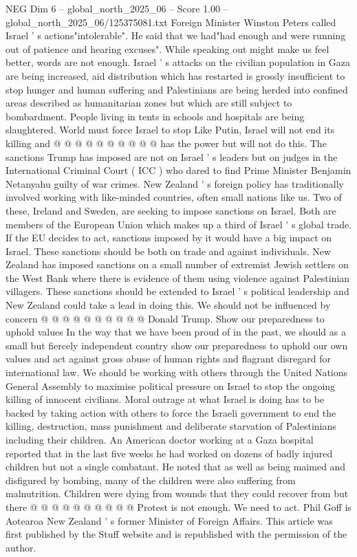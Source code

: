 \begin{textsample}{NEG Dim 6 – global\_north\_2025\_06 – Score 1.00 – global\_north\_2025\_06/125375081.txt}
Foreign Minister Winston Peters called Israel ' s actions"intolerable".
He said that we had"had enough and were running out of patience and hearing excuses".
While speaking out might make us feel better, words are not enough.
Israel ' s attacks on the civilian population in Gaza are being increased, aid distribution which has restarted is grossly insufficient to stop hunger and human suffering and Palestinians are being herded into confined areas described as humanitarian zones but which are still subject to bombardment.
People living in tents in schools and hospitals are being slaughtered.
World must force Israel to stop Like Putin, Israel will not end its killing and @ @ @ @ @ @ @ @ @ @ has the power but will not do this.
The sanctions Trump has imposed are not on Israel ' s leaders but on judges in the International Criminal Court ( ICC ) who dared to find Prime Minister Benjamin Netanyahu guilty of war crimes.
New Zealand ' s foreign policy has traditionally involved working with like-minded countries, often small nations like us.
Two of these, Ireland and Sweden, are seeking to impose sanctions on Israel.
Both are members of the European Union which makes up a third of Israel ' s global trade.
If the EU decides to act, sanctions imposed by it would have a big impact on Israel.
These sanctions should be both on trade and against individuals.
New Zealand has imposed sanctions on a small number of extremist Jewish settlers on the West Bank where there is evidence of them using violence against Palestinian villagers.
These sanctions should be extended to Israel ' s political leadership and New Zealand could take a lead in doing this.
We should not be influenced by concern @ @ @ @ @ @ @ @ @ @ Donald Trump.
Show our preparedness to uphold values In the way that we have been proud of in the past, we should as a small but fiercely independent country show our preparedness to uphold our own values and act against gross abuse of human rights and flagrant disregard for international law.
We should be working with others through the United Nations General Assembly to maximise political pressure on Israel to stop the ongoing killing of innocent civilians.
Moral outrage at what Israel is doing has to be backed by taking action with others to force the Israeli government to end the killing, destruction, mass punishment and deliberate starvation of Palestinians including their children.
An American doctor working at a Gaza hospital reported that in the last five weeks he had worked on dozens of badly injured children but not a single combatant.
He noted that as well as being maimed and disfigured by bombing, many of the children were also suffering from malnutrition.
Children were dying from wounds that they could recover from but there @ @ @ @ @ @ @ @ @ @ Protest is not enough.
We need to act.
Phil Goff is Aotearoa New Zealand ' s former Minister of Foreign Affairs.
This article was first published by the Stuff website and is republished with the permission of the author.

\end{textsample}
